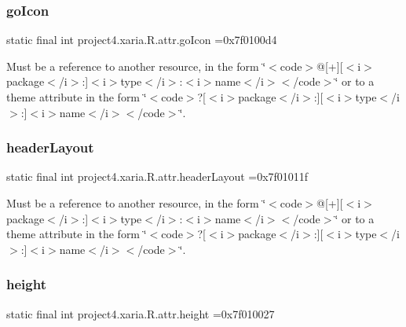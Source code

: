 \subsubsection{\texorpdfstring{go\+Icon}{goIcon}}
{\footnotesize\ttfamily static final int project4.\+xaria.\+R.\+attr.\+go\+Icon =0x7f0100d4\hspace{0.3cm}{\ttfamily [static]}}

Must be a reference to another resource, in the form \char`\"{}$<$code$>$@\mbox{[}+\mbox{]}\mbox{[}$<$i$>$package$<$/i$>$\+:\mbox{]}$<$i$>$type$<$/i$>$\+:$<$i$>$name$<$/i$>$$<$/code$>$\char`\"{} or to a theme attribute in the form \char`\"{}$<$code$>$?\mbox{[}$<$i$>$package$<$/i$>$\+:\mbox{]}\mbox{[}$<$i$>$type$<$/i$>$\+:\mbox{]}$<$i$>$name$<$/i$>$$<$/code$>$\char`\"{}. \mbox{\label{classproject4_1_1xaria_1_1R_1_1attr_a987af45b6d51ee04fc85ec54fd04678e}} 
\subsubsection{\texorpdfstring{header\+Layout}{headerLayout}}
{\footnotesize\ttfamily static final int project4.\+xaria.\+R.\+attr.\+header\+Layout =0x7f01011f\hspace{0.3cm}{\ttfamily [static]}}

Must be a reference to another resource, in the form \char`\"{}$<$code$>$@\mbox{[}+\mbox{]}\mbox{[}$<$i$>$package$<$/i$>$\+:\mbox{]}$<$i$>$type$<$/i$>$\+:$<$i$>$name$<$/i$>$$<$/code$>$\char`\"{} or to a theme attribute in the form \char`\"{}$<$code$>$?\mbox{[}$<$i$>$package$<$/i$>$\+:\mbox{]}\mbox{[}$<$i$>$type$<$/i$>$\+:\mbox{]}$<$i$>$name$<$/i$>$$<$/code$>$\char`\"{}. \mbox{\label{classproject4_1_1xaria_1_1R_1_1attr_a26b79d8ad1413edd2eaa25ac182337b3}} 
\subsubsection{\texorpdfstring{height}{height}}
{\footnotesize\ttfamily static final int project4.\+xaria.\+R.\+attr.\+height =0x7f010027\hspace{0.3cm}{\ttfamily [static]}}

